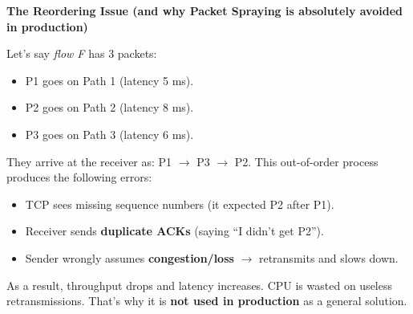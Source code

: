 \highspace
\begin{flushleft}
    \textcolor{Red2}{ \textbf{The Reordering Issue (and why Packet Spraying is absolutely avoided in production)}}
\end{flushleft}
Let's say \emph{flow F} has 3 packets:
\begin{itemize}
    \item P1 goes on Path 1 (latency 5 ms).
    \item P2 goes on Path 2 (latency 8 ms).
    \item P3 goes on Path 3 (latency 6 ms).
\end{itemize}
They arrive at the receiver as: P1 $\rightarrow$ P3 $\rightarrow$ P2. This out-of-order process produces the following errors:
\begin{itemize}
    \item TCP sees missing sequence numbers (it expected P2 after P1).
    \item Receiver sends \textbf{duplicate ACKs} (saying ``I didn't get P2'').
    \item Sender wrongly assumes \textbf{congestion/loss} $\rightarrow$ retransmits and slows down.
\end{itemize}
As a result, throughput drops and latency increases. CPU is wasted on useless retransmissions. That's why it is \textbf{not used in production} as a general solution.